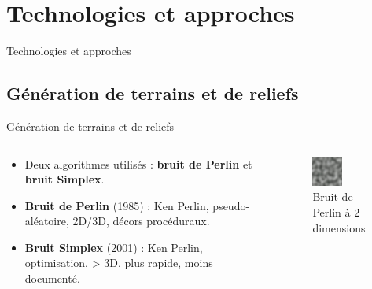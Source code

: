 \documentclass[aspectratio=169]{beamer}
\begin{document}
\section{Technologies et approches}

\begin{frame}{Technologies et approches}
    \tableofcontents[sections={2}]
\end{frame}

\subsection{Génération de terrains et de reliefs}

\begin{frame}{Génération de terrains et de reliefs}
    \begin{columns}
        \centering
        \begin{column}{0.5\textwidth}
            \centering
            \begin{itemize}
                \item Deux algorithmes utilisés : \textbf{bruit de Perlin} et \textbf{bruit Simplex}.
                \item \textbf{Bruit de Perlin} (1985) : Ken Perlin, pseudo-aléatoire, 2D/3D, décors procéduraux.
                \item \textbf{Bruit Simplex} (2001) : Ken Perlin, optimisation, > 3D, plus rapide, moins documenté.
            \end{itemize}
        \end{column}
        \begin{column}{0.5\textwidth}
            \centering
            \begin{figure}
                \centering
                \captionsetup{format=sanslabel}
                \includegraphics[width=0.5\textwidth]{assets/Perlin_noise.jpg}
                \caption{Bruit de Perlin à 2 dimensions}
            \end{figure}
        \end{column}
    \end{columns}
\end{frame}
\end{document}
